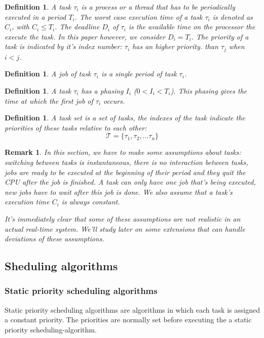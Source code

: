 \documentclass[a4paper,12pt]{article}
\newtheorem{definition}[theorem]{Definition}
\newtheorem{remark}[theorem]{Remark}
\theoremstyle{definition}
\newcommand{\Tau}{\mathcal{T}}
\begin{document}
\begin{definition}
  A \emph{task} $\tau_i$ is a process or a thread that has to be periodically 
  executed in a \emph{period} $T_i$. The worst case \emph{execution time} of a task $\tau_i$ is denoted as 
  $C_i$, with $C_i \leq T_i$. The \emph{deadline} $D_i$ of $\tau_i$ is the available time on the processor 
  the execute the task. In this paper however, we consider $D_i = T_i$. The \emph{priority}  
  of a task is indicated by it's index number: $\tau_i$ has an higher priority. 
  than $\tau_j$ when $i < j$. 
\end{definition}
\begin{definition}
  A \emph{job} of task $\tau_i$ is a single period of task $\tau_i$.
  \end{definition}
  
  \begin{definition}
  A task $\tau_i$ has a phasing $I_i$ ($0 < I_i < T_i$). This phasing 
gives the time at which the first job of $\tau_i$ occurs.
  \end{definition}

\begin{definition}
  A \textit{task set} is a set of tasks, the indexes of the task indicate the priorities of these tasks relative to each 
  other:
  $$\Tau = \{\tau_1, \tau_2, ... \tau_n\}$$
  
  \end{definition}


\begin{remark}
  In this section, we have to make some assumptions about tasks: switching between 
  tasks is instantaneous, there is no interaction between tasks, jobs are ready 
  to be executed at the beginning of their period and they quit the CPU after the job is finished. A task can only have one job that's being executed, new jobs have to wait after this job is done. 
  We also assume that a task's execution time $C_i$ is always constant.
  
  It's immediately clear that some of these assumptions 
  are not realistic in an actual real-time system. We'll study later on some extensions that can handle deviations of these assumptions. 
\end{remark}\label{assumptions}

\subsection{Sheduling algorithms}
\subsubsection{Static priority scheduling algorithms}
Static priority scheduling algorithms are algorithms in which each task is 
assigned a constant priority. The priorities are normally set before executing 
the a static priority scheduling-algorithm. 
\end{document}
